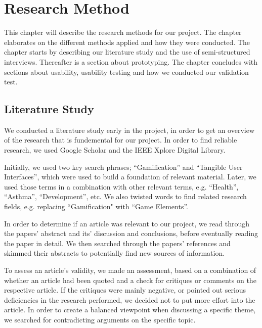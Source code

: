 \chapter{Research Method}
\label{chp:researchmethod}

This chapter will describe the research methods for our project. The chapter elaborates on the different methods applied and how they were conducted. The chapter starts by describing our literature study and the use of semi-structured interviews. Thereafter is a section about prototyping. The chapter concludes with sections about usability, usability testing and how we conducted our validation test.

\section{Literature Study}
\label{sec:literaturestudy}

We conducted a literature study early in the project, in order to get an overview of the research that is fundemental for our project. In order to find reliable research, we used Google Scholar and the IEEE Xplore Digital Library. 

Initially, we used two key search phrases; ``Gamification'' and ``Tangible User Interfaces'', which were used to build a foundation of relevant material. Later, we used those terms in a combination with other relevant terms, e.g. ``Health'', ``Asthma'', ``Development'', etc. We also twisted words to find related research fields, e.g. replacing ``Gamification" with ``Game Elements''. 

In order to determine if an article was relevant to our project, we read through the papers' abstract and its' discussion and conclusions, before eventually reading the paper in detail. We then searched through the papers' references and skimmed their abstracts to potentially find new sources of information. 

To assess an article's validity, we made an assessment, based on a combination of whether an article had been quoted and a check for critiques or comments on the respective article. If the critiques were mainly negative, or pointed out serious deficiencies in the research performed, we decided not to put more effort into the article. In order to create a balanced viewpoint when discussing a specific theme, we searched for contradicting arguments on the specific topic.  

